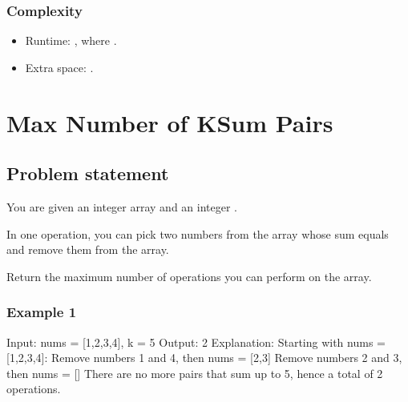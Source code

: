 \documentclass[letterpaper,12pt,english]{book}
\begin{document}
\begin{sphinxVerbatim}[commandchars=\\\{\}]
\end{sphinxVerbatim}


\subsubsection{Complexity}
\label{\detokenize{Counting/136_Single_Number:id2}}\begin{itemize}
\item {} 
\sphinxAtStartPar
Runtime: , where .

\item {} 
\sphinxAtStartPar
Extra space: .

\end{itemize}

\sphinxstepscope


\section{Max Number of K\sphinxhyphen{}Sum Pairs}
\label{\detokenize{Counting/1679_Max_Number_of_K-Sum_Pairs:max-number-of-k-sum-pairs}}\label{\detokenize{Counting/1679_Max_Number_of_K-Sum_Pairs::doc}}

\subsection{Problem statement\sphinxfootnotemark[101]}
\label{\detokenize{Counting/1679_Max_Number_of_K-Sum_Pairs:problem-statement}}%
\begin{footnotetext}[101]\sphinxAtStartFootnote
{}
%
\end{footnotetext}\ignorespaces 
\sphinxAtStartPar
You are given an integer array  and an integer .

\sphinxAtStartPar
In one operation, you can pick two numbers from the array whose sum equals  and remove them from the array.

\sphinxAtStartPar
Return the maximum number of operations you can perform on the array.


\subsubsection{Example 1}
\label{\detokenize{Counting/1679_Max_Number_of_K-Sum_Pairs:example-1}}
\begin{sphinxVerbatim}[commandchars=\\\{\}]
Input: nums = [1,2,3,4], k = 5
Output: 2
Explanation: Starting with nums = [1,2,3,4]:
\PYGZhy{} Remove numbers 1 and 4, then nums = [2,3]
\PYGZhy{} Remove numbers 2 and 3, then nums = []
There are no more pairs that sum up to 5, hence a total of 2 operations.
\end{sphinxVerbatim}
\end{document}
